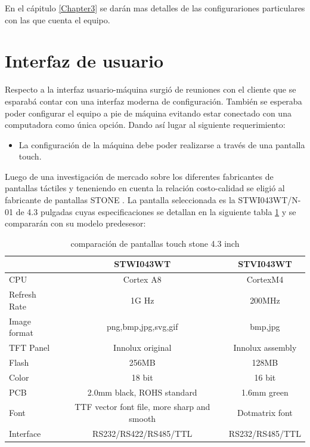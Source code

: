 En el cápitulo \ref{Chapter3} se darán mas detalles de las configurariones particulares con las que cuenta el equipo.

\section{Interfaz de usuario}

Respecto a la interfaz usuario-máquina surgió de reuniones con el cliente que se esparabá contar con una interfaz moderna de configuración. También se esperaba poder configurar el equipo a pie de máquina evitando estar conectado con una computadora como única opción. Dando así lugar al siguiente requerimiento:
\begin{itemize}
\item La configuración de la máquina debe poder realizarse a través de una pantalla touch.	
\end{itemize} 

Luego de una investigación de mercado sobre los diferentes fabricantes de pantallas táctiles y teneniendo en cuenta la relación costo-calidad se eligió al fabricante de pantallas STONE \citep{web_stone}. La pantalla seleccionada es la STWI043WT/N-01 de 4.3 pulgadas cuyas especificaciones se detallan en la siguiente tabla \ref{tab:tabla_stone} y se compararán con su modelo predesesor:


\begin{table}[h]
	\centering
	\caption[compatación stone]{comparación de pantallas touch stone 4.3 inch}
	\begin{tabular}{l c c}    
		\toprule
		\textbf{}     & \textbf{STWI043WT} & \textbf{STVI043WT}\\
		\midrule
		CPU 			& 	Cortex A8         & 	CortexM4 \\		
		Refresh Rate    & 	1G Hz         & 	200MHz\\
		Image format  	& 	png,bmp,jpg,svg,gif          & 	bmp,jpg \\
		TFT Panel  		& 	Innolux original          & 	Innolux assembly \\
		Flash  			& 	256MB          & 	128MB \\
		Color  			& 	18 bit          & 	16 bit  \\
		PCB 			& 	2.0mm black, ROHS standard          & 	1.6mm green \\
		Font 			& 	TTF vector font file, more sharp and smooth          & 	Dotmatrix font \\
		Interface 		& 	RS232/RS422/RS485/TTL           & 	RS232/RS485/TTL \\
		\bottomrule
		\hline
	\end{tabular}
	\label{tab:tabla_stone}
\end{table}





